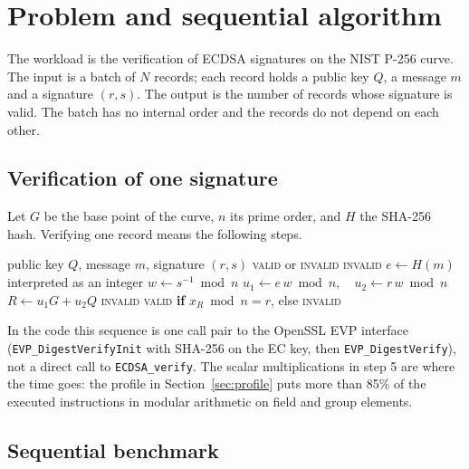 \documentclass[11pt,a4paper]{article}
\begin{document}
\section{Problem and sequential algorithm}

The workload is the verification of ECDSA signatures on the NIST P-256 curve. The input is a batch of $N$ records; each record holds a public key $Q$, a message $m$ and a signature $(r,s)$. The output is the number of records whose signature is valid. The batch has no internal order and the records do not depend on each other.

\subsection{Verification of one signature}

Let $G$ be the base point of the curve, $n$ its prime order, and $H$ the SHA-256 hash. Verifying one record means the following steps.

\begin{algorithm}[H]
\caption{Verification of one ECDSA signature (sequential)}
\begin{algorithmic}[1]
\Require public key $Q$, message $m$, signature $(r,s)$
\Ensure \textsc{valid} or \textsc{invalid}
 \Return \textsc{invalid} \EndIf
\State $e \gets H(m)$ interpreted as an integer
\State $w \gets s^{-1} \bmod n$
\State $u_1 \gets e\,w \bmod n,\quad u_2 \gets r\,w \bmod n$
\State $R \gets u_1 G + u_2 Q$ 
 \Return \textsc{invalid} \EndIf
\State \Return \textsc{valid} \textbf{if} $x_R \bmod n = r$, else \textsc{invalid}
\end{algorithmic}
\end{algorithm}

In the code this sequence is one call pair to the OpenSSL EVP interface (\texttt{EVP\_DigestVerifyInit} with SHA-256 on the EC key, then \texttt{EVP\_DigestVerify}), not a direct call to \texttt{ECDSA\_verify}. The scalar multiplications in step 5 are where the time goes: the profile in Section~\ref{sec:profile} puts more than 85\% of the executed instructions in modular arithmetic on field and group elements.

\subsection{Sequential benchmark}
\end{document}
